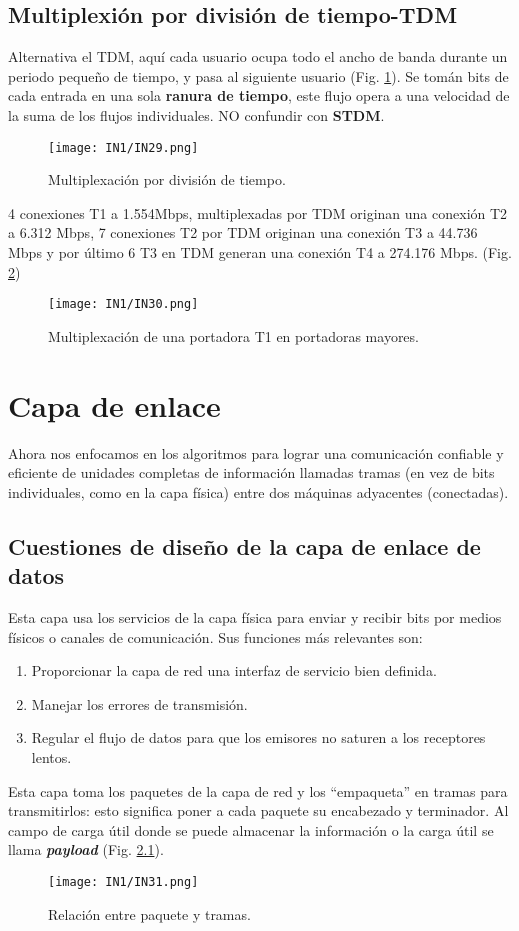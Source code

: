 \documentclass[
	12pt, %
	fleqn, %
	a4paper, %
	oneside, %
]{LegrandOrangeBook}
\begin{document}
\section{Multiplexión por división de tiempo-TDM}
Alternativa el TDM, aquí cada usuario ocupa todo el ancho de banda durante un periodo pequeño de tiempo, y pasa al siguiente usuario (Fig. \ref{fig: tdm}). Se tomán bits de cada entrada en una sola \textbf{ranura de tiempo}, este flujo opera a una velocidad de la suma de los flujos individuales. NO confundir con \textbf{STDM}.
\begin{figure}[]
\centering
\texttt{[image: IN1/IN29.png]}
\caption{Multiplexación por división de tiempo.}
\label{fig: tdm}
\end{figure}
4 conexiones T1 a 1.554Mbps, multiplexadas por TDM originan una conexión T2 a 6.312 Mbps, 7 conexiones T2 por TDM originan una conexión T3 a 44.736 Mbps y por último 6 T3 en TDM generan una conexión T4 a 274.176 Mbps. (Fig. \ref{fig: t1 carrier})
\begin{figure}[]
\centering
\texttt{[image: IN1/IN30.png]}
\caption{Multiplexación de una portadora T1 en portadoras mayores.}
\label{fig: t1 carrier}
\end{figure}
\chapter{Capa de enlace}
Ahora nos enfocamos en los algoritmos para lograr una comunicación confiable y eficiente de unidades completas de información llamadas tramas (en vez de bits individuales, como en la capa física) entre dos máquinas adyacentes (conectadas).
\section{Cuestiones de diseño de la capa de enlace de datos}
Esta capa usa los servicios de la capa física para enviar y recibir bits por medios físicos o canales de comunicación. Sus funciones más relevantes son:
\begin{enumerate}
\item Proporcionar  la capa de red una interfaz de servicio bien definida.
\item Manejar los errores de transmisión.
\item Regular el flujo de datos para que los emisores no saturen a los receptores lentos.
\end{enumerate}
Esta capa toma los paquetes de la capa de red y los ``empaqueta'' en tramas para transmitirlos: esto significa poner a cada paquete su encabezado y terminador. Al campo de carga útil donde se puede almacenar la información o la carga útil se llama \textbf{\textit{payload}} (Fig. \ref{fig: paquete y trama}).
\begin{figure}[]
\centering
\texttt{[image: IN1/IN31.png]}
\caption{Relación entre paquete y tramas.}
\label{fig: paquete y trama}
\end{figure}
\end{document}

